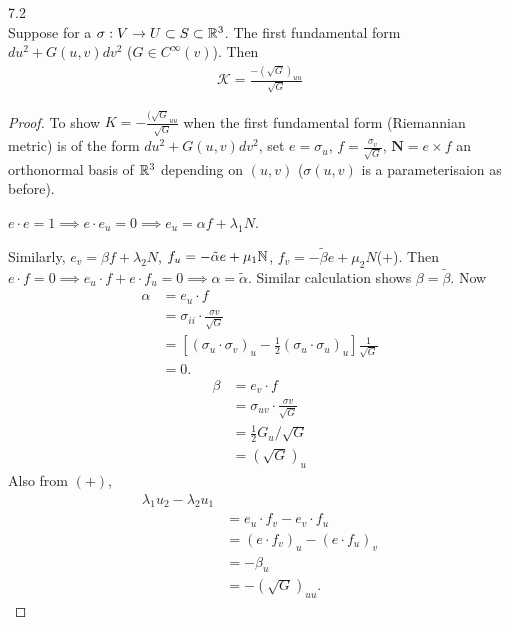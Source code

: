 \documentclass[a4paper]{article}
\begin{document}
\begin{thm} 7.2\\
Suppose for a $\sigma:V \to U \subset S \subset \mathbb{R}^3$. The first fundamental form $du^2+G(u,v)dv^2$ ($G \in C^\infty(v)$). Then
\begin{equation*}
\begin{aligned}
\mathcal{K} =\frac{-(\sqrt{G})_{uu}}{\sqrt{G}}
\end{aligned}
\end{equation*}
\begin{proof}
To show $K=-\frac{(\sqrt{G}_{uu}}{\sqrt{G}}$ when the first fundamental form (Riemannian metric) is of the form $du^2 + G(u,v) dv^2$, set $e=\sigma_u$, $f=\frac{\sigma_v}{\sqrt{G}}$, $\mathbf{N} = e \times f$ an orthonormal basis of $\mathbb{R}^3$ depending on $(u,v)$ ($\sigma(u,v)$ is a parameterisaion as before).

$e\cdot e=1 \implies e \cdot e_u = 0 \implies e_u = \alpha f + \lambda_1 N$.

Similarly, $e_v = \beta f + \lambda_2 N$, $f_u = -\tilde{\alpha} e + \mu_1 \mathbb{N}$, $f_v = -\tilde{\beta} e + \mu_2 N$($+$). Then
$e \cdot f = 0 \implies e_u \cdot f + e \cdot f_u = 0 \implies \alpha = \tilde{\alpha}$. Similar calculation shows $\beta = \tilde{\beta}$. Now
\begin{equation*}
\begin{aligned}
\alpha &= e_u \cdot f\\
&= \sigma_{ii} \cdot \frac{\sigma v}{\sqrt{G}}\\
&= \left[(\sigma_u \cdot \sigma_v)_u - \frac{1}{2} (\sigma_u \cdot \sigma_u)_u \right] \frac{1}{\sqrt{G}}\\
&= 0.
\end{aligned}
\end{equation*}
\begin{equation*}
\begin{aligned}
\beta &= e_v \cdot f\\
&= \sigma_{uv} \cdot \frac{\sigma v}{\sqrt{G}}\\
&= \frac{1}{2} G_u / \sqrt{G}\\
&= (\sqrt{G})_u
\end{aligned}
\end{equation*}
Also from $(+)$, 
\begin{equation*}
\begin{aligned}
\lambda_1 u_2 - \lambda_2 u_1 \\
&= e_u \cdot f_v - e_v \cdot f_u \\
&= (e \cdot f_v)_u - (e \cdot f_u)_v\\
&= -\beta_u\\
&= -(\sqrt{G})_{uu}.
\end{aligned}
\end{equation*}


\end{proof}
\end{thm}
\end{document}
